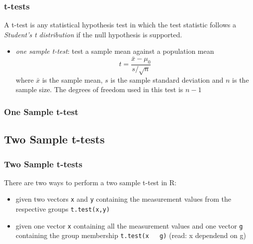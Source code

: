 \documentclass[xcolor={table}]{beamer}
\begin{document}

\begin{frame}[fragile]\frametitle{t-tests}
A t-test is any statistical hypothesis test in which the test statistic follows a \emph{Student's t distribution} if the null hypothesis is supported.
\begin{itemize}
\item \emph{one sample t-test}: test a sample mean against a population mean
$$ t = \frac{\bar{x}-\mu_0}{s/\sqrt{n}}$$ where $\bar{x}$ is the sample mean, $s$ is the sample standard deviation and $n$ is the sample size. The degrees of freedom used in this test is $n-1$
\end{itemize}
\end{frame}

\begin{frame}[fragile]\frametitle{One Sample t-test}
\end{frame}


\subsection{Two Sample t-tests}


\begin{frame}[fragile]\frametitle{Two Sample t-tests}
There are two ways to perform a two sample t-test in R:
\begin{itemize}
\item given two vectors \texttt{x} and \texttt{y} containing the measurement values from the respective groups \texttt{t.test(x,y)}
\item given one vector \texttt{x} containing all the measurement values and one vector \texttt{g} containing the group membership \texttt{t.test(x ~ g)} (read: x dependend on g)
\end{itemize}
\end{frame}
\end{document}

